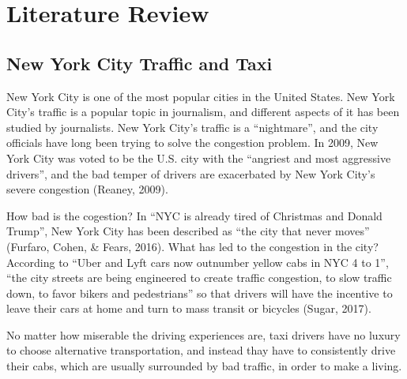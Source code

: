 \documentclass[12pt,twoside]{reedthesis}
\theoremstyle{definition}
\theoremstyle{definition}
\theoremstyle{definition}
\theoremstyle{remark}
\begin{document}
\section{Literature Review}\label{literature-review}

\subsection{New York City Traffic and
Taxi}\label{new-york-city-traffic-and-taxi}

New York City is one of the most popular cities in the United States.
New York City's traffic is a popular topic in journalism, and different
aspects of it has been studied by journalists. New York City's traffic
is a ``nightmare'', and the city officials have long been trying to
solve the congestion problem. In 2009, New York City was voted to be the
U.S. city with the ``angriest and most aggressive drivers'', and the bad
temper of drivers are exacerbated by New York City's severe congestion
(Reaney, 2009).

How bad is the cogestion? In ``NYC is already tired of Christmas and
Donald Trump'', New York City has been described as ``the city that
never moves'' (Furfaro, Cohen, \& Fears, 2016). What has led to the
congestion in the city? According to ``Uber and Lyft cars now outnumber
yellow cabs in NYC 4 to 1'', ``the city streets are being engineered to
create traffic congestion, to slow traffic down, to favor bikers and
pedestrians'' so that drivers will have the incentive to leave their
cars at home and turn to mass transit or bicycles (Sugar, 2017).

No matter how miserable the driving experiences are, taxi drivers have
no luxury to choose alternative transportation, and instead thay have to
consistently drive their cabs, which are usually surrounded by bad
traffic, in order to make a living.
\end{document}
